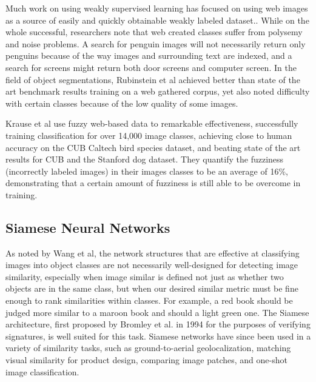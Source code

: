 \documentclass[pageno]{jpaper}
\begin{document}
Much work on using weakly supervised learning has focused on using web images as a source of easily and quickly obtainable weakly labeled dataset.\cite{bergamo2010exploiting}\cite{fergus2010learning}\cite{li2010optimol}\cite{schroff2011harvesting}. While on the whole successful, researchers note that web created classes suffer from polysemy and noise problems. A search for penguin images will not necessarily return only penguins because of the way images and surrounding text are indexed, and a search for screens might return both door screens and computer screen. In the field of object segmentations, Rubinstein et al achieved better than state of the art benchmark results training on a web gathered corpus, yet also noted difficulty with certain classes because of the low quality of some images.\cite{rubinstein2013unsupervised}

Krause et al use fuzzy web-based data to remarkable effectiveness, successfully training classification for over 14,000 image classes, achieving close to human accuracy on the CUB Caltech bird species dataset, and beating state of the art results for CUB and the Stanford dog dataset\cite{krause2016unreasonable}. They quantify the fuzziness (incorrectly labeled images) in their images classes to be an average of 16\%, demonstrating that a certain amount of fuzziness is still able to be overcome in training. 


\subsection{Siamese Neural Networks}

As noted by Wang et al\cite{wang2014learning}, the network structures that are effective at classifying images into object classes are not necessarily well-designed for detecting image similarity, especially when image similar is defined not just as whether two objects are in the same class, but when our desired similar metric must be fine enough to rank similarities within classes. For example, a red book should be judged more similar to a maroon book and should a light green one. The Siamese architecture, first proposed by Bromley et al. in 1994\cite{bromley1993signature} for the purposes of verifying signatures, is well suited for this task. Siamese networks have since been used in a variety of similarity tasks, such as ground-to-aerial geolocalization\cite{lin2015learning}, matching visual similarity for product design\cite{bell2015learning}, comparing image patches\cite{zagoruyko2015learning}, and one-shot image classification\cite{koch2015siamese}.\\
\end{document}
